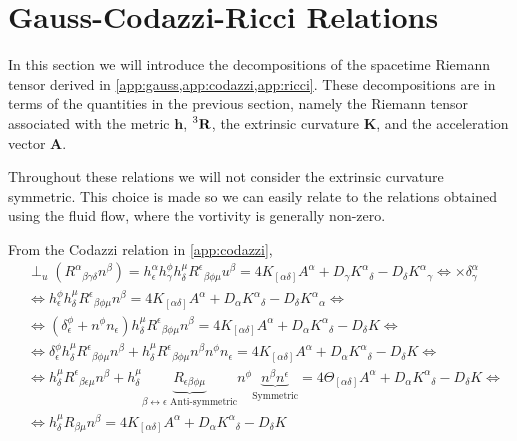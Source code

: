 \section{Gauss-Codazzi-Ricci Relations}

In this section we will introduce the decompositions of the spacetime Riemann tensor derived in \cref{app:gauss,app:codazzi,app:ricci}.
These decompositions are in terms of the quantities in the previous section, namely the Riemann tensor associated with the metric $\mathbf{h}$, $\prescript{3}{}{\mathbf{R}}$, the extrinsic curvature $\mathbf{K}$, and the acceleration vector $\mathbf{A}$.

Throughout these relations we will not consider the extrinsic curvature symmetric. 
This choice is made so we can easily relate to the relations obtained using the fluid flow, where the vortivity is generally non-zero.

From the Codazzi relation in \cref{app:codazzi},
\begin{align}
    &\perp_u (R^\alpha{}_{\beta\gamma\delta} n^\beta)= h^\alpha_\epsilon h^\phi_\gamma h^\mu_\delta R^\epsilon{}_{\beta\phi\mu} u^\beta= 4 K_{[\alpha\delta]}A^\alpha + D_\gamma K^\alpha{}_\delta - D_\delta K^\alpha{}_\gamma \Leftrightarrow \times \delta_\gamma^\alpha\\
    &\Leftrightarrow h^\phi_\epsilon h^\mu_\delta R^\epsilon{}_{\beta\phi\mu} n^\beta = 4 K_{[\alpha\delta]}A^\alpha + D_\alpha K^\alpha{}_\delta - D_\delta K^\alpha{}_\alpha \Leftrightarrow \\
    &\Leftrightarrow (\delta^\phi_\epsilon + n^\phi n_\epsilon)h^\mu_\delta R^\epsilon{}_{\beta\phi\mu} n^\beta = 4 K_{[\alpha\delta]}A^\alpha + D_\alpha K^\alpha{}_\delta - D_\delta K \Leftrightarrow \\
    &\Leftrightarrow \delta^\phi_\epsilon h^\mu_\delta R^\epsilon{}_{\beta\phi\mu} n^\beta  + h^\mu_\delta R^\epsilon{}_{\beta\phi\mu} n^\beta  n^\phi n_\epsilon = 4 K_{[\alpha\delta]}A^\alpha + D_\alpha K^\alpha{}_\delta - D_\delta K\Leftrightarrow \\
    &\Leftrightarrow  h^\mu_\delta R^\epsilon{}_{\beta\epsilon\mu} n^\beta  + h^\mu_\delta \underbrace{R_{\epsilon\beta\phi\mu}}_{\beta \leftrightarrow \epsilon \text{ Anti-symmetric}}   n^\phi \underbrace{n^\beta n^\epsilon}_{\text{Symmetric}} = 4 \Theta_{[\alpha\delta]}A^\alpha + D_\alpha K^\alpha{}_\delta - D_\delta K \Leftrightarrow \\
    &\Leftrightarrow h^\mu_\delta R_{\beta\mu} n^\beta = 4 K_{[\alpha\delta]}A^\alpha + D_\alpha K^\alpha{}_\delta - D_\delta K
    \label{eqn:ricci_extradig_proj}
\end{align}

